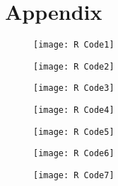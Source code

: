 \documentclass[12pt, letterpaper]{article}
\theoremstyle{definition}
\numberwithin{equation}{section}
\newcommand{\+}[1]{+_{\scalebox{.375}{#1}}}
\newcommand{\1}{\mathbbm{1}}
\begin{document}
\newpage
\section{Appendix}

\begin{figure}[H]
	\centering
	\texttt{[image: R Code1]}
\end{figure}
\vspace{-1cm}
\begin{figure}[H]
	\centering
	\texttt{[image: R Code2]}
\end{figure}
\vspace{-1cm}
\begin{figure}[H]
	\centering
	\texttt{[image: R Code3]}
\end{figure}
\vspace{-1cm}
\begin{figure}[H]
	\centering
	\texttt{[image: R Code4]}
\end{figure}
\vspace{-1cm}
\begin{figure}[H]
	\centering
	\texttt{[image: R Code5]}
\end{figure}
\vspace{-1cm}
\begin{figure}[H]
	\centering
	\texttt{[image: R Code6]}
\end{figure}
\vspace{-1cm}
\begin{figure}[H]
	\centering
	\texttt{[image: R Code7]}
\end{figure}
\end{document}
